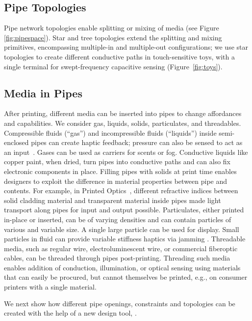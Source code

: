 \subsection{Pipe Topologies}
Pipe network topologies enable splitting or mixing of media (see Figure \ref{fig:pipespace}).  Star and tree topologies extend the splitting and mixing primitives, encompassing multiple-in and multiple-out configurations; we use star topologies to create different conductive paths in touch-sensitive toys, with a single terminal for swept-frequency capacitive sensing (Figure~\ref{fig:toys}).

\subsection{Media in Pipes}
After printing, different media can be inserted into pipes to change affordances and capabilities. We consider gas, liquids, solids, particulates, and threadables. 
%
Compressible fluids (``gas'') and incompressible fluids (``liquids'')  inside semi-enclosed pipes can create haptic feedback; pressure can also be sensed to act as an input~\cite{Slyper-shape}. Gases can be used as carriers for scents or fog. Conductive liquids like copper paint, when dried, turn pipes into conductive paths and can also fix electronic components in place.
%
Filling pipes with solids at print time enables designers to exploit the difference in material properties between pipe and contents. For example, in Printed Optics~\cite{Willis-printedoptics}, different refractive indices between solid cladding material and transparent material inside pipes made light transport along pipes for input and output possible.
%
Particulates, either printed in-place or inserted, can be of varying densities and can contain particles of various and variable size.  A single large particle can be used for display.  Small particles in fluid can provide variable stiffness haptics via jamming \cite{Follmer-jamming}. 
%
Threadable media, such as regular wire, electroluminescent wire, or commercial fiberoptic cables, can be threaded through pipes post-printing. Threading such media enables addition of conduction, illumination, or optical sensing using materials that can easily be procured, but cannot themselves be printed, e.g., on consumer printers with a single material. 

We next show how different pipe openings, constraints and topologies can be created with the help of a new design tool, \systemname.
